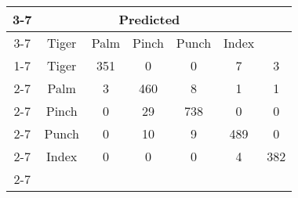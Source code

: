 \documentclass{standalone}
\begin{document}
 
 \begin{tabular}{|c |c |c |c |c |c |c |}
\cline{3-7}\multicolumn{2}{c|}{} & \multicolumn{5}{c|}{Predicted} \\ 
\cline{3-7} \multicolumn{2}{c |}{ } & Tiger & Palm & Pinch & Punch & Index\\ 
\cline{1-7}\multirow{5}{*}{\rotatebox[origin=c]{90}{Actual}} & Tiger & 351 & 0 & 0 & 7 & 3\\ 
 \cline{2-7} & Palm & 3 & 460 & 8 & 1 & 1\\ 
 \cline{2-7} & Pinch & 0 & 29 & 738 & 0 & 0\\ 
 \cline{2-7} & Punch & 0 & 10 & 9 & 489 & 0\\ 
 \cline{2-7} & Index & 0 & 0 & 0 & 4 & 382\\ 
 \cline{2-7}\hline \end{tabular}
 
\end{document}
